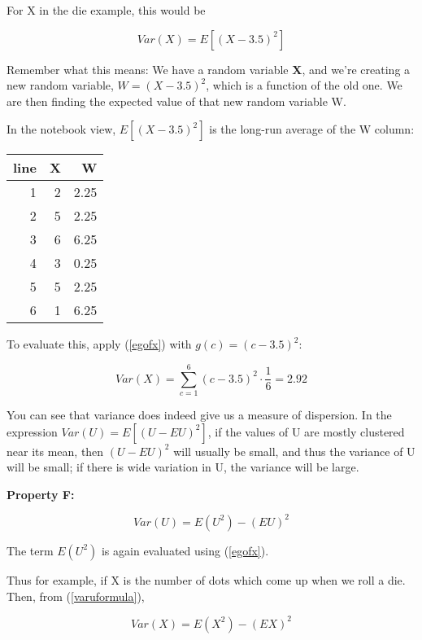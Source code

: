 For X in the die example, this would be

\begin{equation}
\label{dievar} 
Var(X) = E[(X-3.5)^2]
\end{equation}

Remember what this means:  We have a random variable {\bf X}, and we're
creating a new random variable, $W = (X-3.5)^2$, which is a function of
the old one.  We are then finding the expected value of that new random
variable W.

In the notebook view, $E[(X-3.5)^2]$ is the long-run average of the W
column:

\vskip 0.5in
\begin{tabular}{|r|r|r|}
\hline
line & X & W \\ \hline 
\hline
1 & 2 & 2.25 \\ \hline 
2 & 5 & 2.25 \\ \hline 
3 & 6 & 6.25 \\ \hline 
4 & 3 & 0.25 \\ \hline 
5 & 5 & 2.25 \\ \hline 
6 & 1 & 6.25 \\ \hline 
\end{tabular}

To evaluate this, apply (\ref{egofx}) with $g(c) = (c-3.5)^2$:

\begin{equation}
Var(X) = \sum_{c=1}^6 (c-3.5)^2 \cdot \frac{1}{6} = 2.92
\end{equation}

You can see that variance does indeed give us a measure of dispersion.
In the expression $Var(U) = E[(U-EU)^2]$, if the values of U are mostly
clustered near its mean, then $(U-EU)^2$ will usually be small, and thus
the variance of U will be small; if there is wide variation in U, the
variance will be large.


{\bf Property F:}

\begin{equation} 
\label{varuformula}
Var(U) = E(U^2) - (EU)^2
\end{equation}

The term $E(U^2)$ is again evaluated using (\ref{egofx}). 

Thus for example, if X is the number of dots which come up when we roll
a die.   Then, from (\ref{varuformula}), 

\begin{equation}
Var(X) = E(X^2) - (EX)^2
\end{equation}

